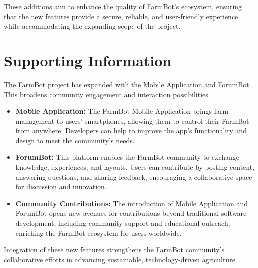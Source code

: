 These additions aim to enhance the quality of FarmBot's ecosystem, ensuring that the new features provide a secure, reliable, and user-friendly experience while accommodating the expanding scope of the project.

\section{Supporting Information}
The FarmBot project has expanded with the Mobile Application and ForumBot. This broadens community engagement and interaction possibilities.
\begin{itemize}
    \item \textbf{Mobile Application:} The FarmBot Mobile Application brings farm management to users' smartphones, allowing them to control their FarmBot from anywhere. Developers can help to improve the app's functionality and design to meet the community's needs.
    \item \textbf{ForumBot:} This platform enables the FarmBot community to exchange knowledge, experiences, and layouts. Users can contribute by posting content, answering questions, and sharing feedback, encouraging a collaborative space for discussion and innovation.
    \item \textbf{Community Contributions:} The introduction of Mobile Application and ForumBot opens new avenues for contributions beyond traditional software development, including community support and educational outreach, enriching the FarmBot ecosystem for users worldwide.
\end{itemize}
Integration of these new features strengthens the FarmBot community's collaborative efforts in advancing sustainable, technology-driven agriculture.